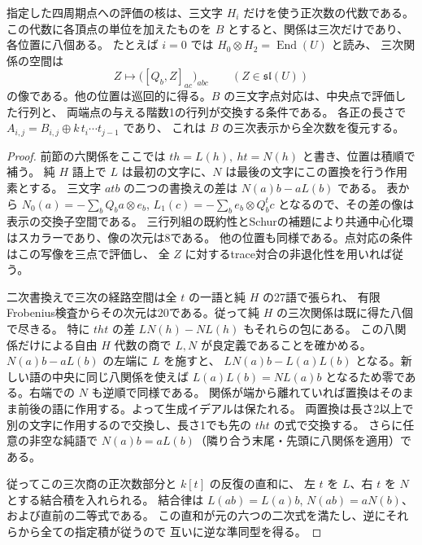 \begin{proposition}\label{prop:point-kernel-cubic-presentation}
指定した四周期点への評価の核は、三文字 $H_i$ だけを使う正次数の代数である。
この代数に各頂点の単位を加えたものを $B$ とすると、関係は三次だけであり、各位置に八個ある。
たとえば $i=0$ では $H_0\otimes H_2=\operatorname{End}(U)$ と読み、
三次関係の空間は
\[
 Z\longmapsto \big([Q_b,Z]_{ac}\big)_{abc}
 \qquad (Z\in\mathfrak{sl}(U))
\]
の像である。他の位置は巡回的に得る。$B$ の三文字点対応は、中央点で評価した行列と、
両端点の与える階数1の行列が交換する条件である。
各正の長さで $A_{i,j}=B_{i,j}\oplus k\,t_i\cdots t_{j-1}$ であり、
これは $B$ の三次表示から全次数を復元する。
\end{proposition}
\begin{proof}
前節の六関係をここでは $t h=L(h),\ h t=N(h)$ と書き、位置は積順で補う。
純 $H$ 語上で $L$ は最初の文字に、$N$ は最後の文字にこの置換を行う作用素とする。
三文字 $a t b$ の二つの書換えの差は $N(a)b-aL(b)$ である。
表から $N_0(a)=-\sum_b Q_b a\otimes e_b$,
$L_1(c)=-\sum_b e_b\otimes Q_b^t c$ となるので、その差の像は表示の交換子空間である。
三行列組の既約性とSchurの補題により共通中心化環はスカラーであり、像の次元は8である。
他の位置も同様である。点対応の条件はこの写像を三点で評価し、
全 $Z$ に対するtrace対合の非退化性を用いれば従う。

二次書換えで三次の経路空間は全 $t$ の一語と純 $H$ の27語で張られ、
有限Frobenius検査からその次元は20である。従って純 $H$ の三次関係は既に得た八個で尽きる。
特に $t h t$ の差 $LN(h)-NL(h)$ もそれらの包にある。
この八関係だけによる自由 $H$ 代数の商で $L,N$ が良定義であることを確かめる。
$N(a)b-aL(b)$ の左端に $L$ を施すと、
$LN(a)b-L(a)L(b)$ となる。新しい語の中央に同じ八関係を使えば
$L(a)L(b)=NL(a)b$ となるため零である。右端での $N$ も逆順で同様である。
関係が端から離れていれば置換はそのまま前後の語に作用する。よって生成イデアルは保たれる。
両置換は長さ2以上で別の文字に作用するので交換し、長さ1でも先の $t h t$ の式で交換する。
さらに任意の非空な純語で $N(a)b=aL(b)$（隣り合う末尾・先頭に八関係を適用）である。

従ってこの三次商の正次数部分と $k[t]$ の反復の直和に、
左 $t$ を $L$、右 $t$ を $N$ とする結合積を入れられる。
結合律は $L(ab)=L(a)b$, $N(ab)=aN(b)$、および直前の二等式である。
この直和が元の六つの二次式を満たし、逆にそれらから全ての指定積が従うので
互いに逆な準同型を得る。
\end{proof}
